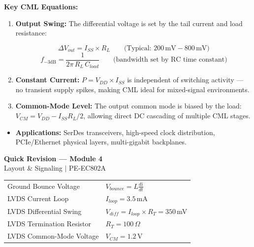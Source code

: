 \documentclass[12pt,a4paper]{article}
\renewcommand{\arraystretch}{1.45}
\begin{document}
\textbf{Key CML Equations:}
\begin{enumerate}[label=\textbf{\arabic*.}, leftmargin=*, itemsep=3.5pt]
  \item \textbf{Output Swing:} The differential voltage is set by the tail current and load resistance:
  \begin{tcolorbox}[formulabox, title={\textbf{CML Output Swing and Bandwidth}}]
  \[
  \Delta V_{out} = I_{SS} \times R_L \qquad \text{(Typical: } 200\,\text{mV} - 800\,\text{mV)}
  \]
  \[
  f_{-3\text{dB}} = \frac{1}{2\pi\, R_L\, C_{load}} \qquad \text{(bandwidth set by RC time constant)}
  \]
  \end{tcolorbox}
  \item \textbf{Constant Current:} $P = V_{DD} \times I_{SS}$ is independent of switching activity --- no transient supply spikes, making CML ideal for mixed-signal environments.
  \item \textbf{Common-Mode Level:} The output common mode is biased by the load: $V_{CM} = V_{DD} - I_{SS} R_L / 2$, allowing direct DC cascading of multiple CML stages.
\end{enumerate}
\begin{itemize}[leftmargin=*, itemsep=2pt]
  \item \textbf{Applications:} SerDes transceivers, high-speed clock distribution, PCIe/Ethernet physical layers, multi-gigabit backplanes.
\end{itemize}

\newpage
\begin{center}
  {\large\bfseries\color{myred} Quick Revision --- Module 4}\\[3pt]
  {\small\color{mydark} Layout \& Signaling $|$ PE-EC802A}
\end{center}
\noindent{\color{myred}\rule{\linewidth}{1.2pt}}
\vspace{4pt}

\begin{tcolorbox}[formulabox, title={\textbf{Key Formulas at a Glance}}]
\renewcommand{\arraystretch}{1.35}
\begin{tabularx}{\linewidth}{B{5.0cm} X}
Ground Bounce Voltage & $V_{bounce} = L \frac{di}{dt}$ \\[4pt]
LVDS Current Loop & $I_{loop} = 3.5\,$mA \\[4pt]
LVDS Differential Swing & $V_{diff} = I_{loop} \times R_T = 350\,$mV \\[4pt]
LVDS Termination Resistor & $R_T = 100\,\Omega$ \\[4pt]
LVDS Common-Mode Voltage & $V_{CM} = 1.2\,$V \\[4pt]
\end{tabularx}
\end{tcolorbox}
\end{document}
